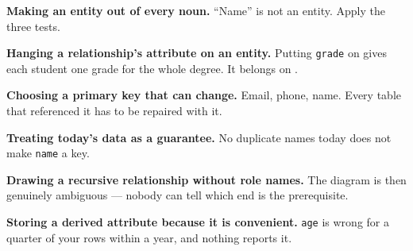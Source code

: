 \begin{pitfall}
\begin{tight}
  \item \textbf{Making an entity out of every noun.} ``Name'' is not an
        entity. Apply the three tests.
  \item \textbf{Hanging a relationship's attribute on an entity.} Putting
        \texttt{grade} on  gives each student one grade for
        the whole degree. It belongs on .
  \item \textbf{Choosing a primary key that can change.} Email, phone, name.
        Every table that referenced it has to be repaired with it.
  \item \textbf{Treating today's data as a guarantee.} No duplicate names today
        does not make \texttt{name} a key.
  \item \textbf{Drawing a recursive relationship without role names.} The
        diagram is then genuinely ambiguous --- nobody can tell which end is
        the prerequisite.
  \item \textbf{Storing a derived attribute because it is convenient.}
        \texttt{age} is wrong for a quarter of your rows within a year, and
        nothing reports it.
\end{tight}
\end{pitfall}

